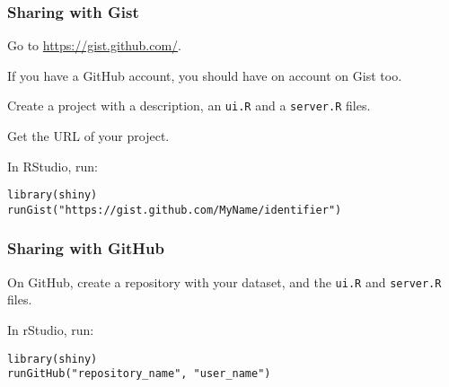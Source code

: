 \documentclass{beamer}
\begin{document}
	\begin{frame}[fragile]
		\frametitle{Sharing with Gist}

		Go to \href{https://gist.github.com/}{https://gist.github.com/}.

		\vspace{1em}

		If you have a GitHub account, you should have on account on Gist too.

		\vspace{1em}

		Create a project with a description, an \verb|ui.R| and a \verb|server.R| files.

		\vspace{1em}

		Get the URL of your project.

		\vspace{1em}

		In RStudio, run:
		
		\begin{exampleblock}{}
		\begin{BVerbatim}
library(shiny)
runGist("https://gist.github.com/MyName/identifier")
		\end{BVerbatim}
		\end{exampleblock}{}

	\end{frame}

	\begin{frame}[fragile]
		\frametitle{Sharing with GitHub}

		On GitHub, create a repository with your dataset, and the \verb|ui.R| and \verb|server.R| files.

		\vspace{1em}

		In rStudio, run:
		
		\begin{exampleblock}{}
		\begin{BVerbatim}
library(shiny)
runGitHub("repository_name", "user_name")
		\end{BVerbatim}
		\end{exampleblock}{}

	\end{frame}
\end{document}
